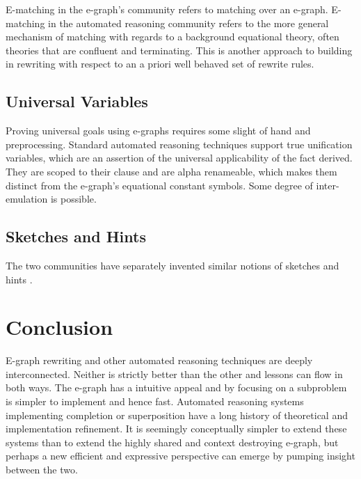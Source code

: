 \documentclass[sigplan,10pt,review,anonymous]{acmart}
\begin{document}
E-matching in the e-graph's community refers to matching over an e-graph. E-matching in the automated reasoning community refers to the more general mechanism of matching with regards to a background equational theory, often theories that are confluent and terminating. This is another approach to building in rewriting with respect to an a priori well behaved set of rewrite rules.

\subsection{Universal Variables}
Proving universal goals using e-graphs requires some slight of hand and preprocessing. Standard automated reasoning techniques support true unification variables, which are an assertion of the universal applicability of the fact derived. They are scoped to their clause and are alpha renameable, which makes them distinct from the e-graph's equational constant symbols. Some degree of inter-emulation is possible.

\subsection{Sketches and Hints}
The two communities have separately invented similar notions of sketches \cite{sketch} and hints \cite{hints}.




\section{Conclusion}
E-graph rewriting and other automated reasoning techniques are deeply interconnected. Neither is strictly better than the other and lessons can flow in both ways. The e-graph has a intuitive appeal and by focusing on a subproblem is simpler to implement and hence fast. Automated reasoning systems implementing completion or superposition have a long history of theoretical and implementation refinement. It is seemingly conceptually simpler to extend these systems than to extend the highly shared and context destroying e-graph, but perhaps a new efficient and expressive perspective can emerge by pumping insight between the two.
\end{document}
